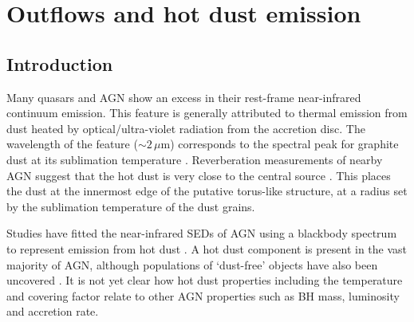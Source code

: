 
\chapter{Outflows and hot dust emission}
\label{ch:sed} 



\section{Introduction}

Many quasars and AGN show an excess in their rest-frame near-infrared continuum emission. 
This feature is generally attributed to thermal emission from dust heated by optical/ultra-violet radiation from the accretion disc. 
The wavelength of the feature ($\sim2$\,$\mu$m) corresponds to the spectral peak for graphite dust at its sublimation temperature \citep[$T\sim1500$\,K;][]{barvainis87}. 
Reverberation measurements of nearby AGN suggest that the hot dust is very close to the central source \citep[few tens of light days; e.g.][]{minezaki04,suganuma06}.
This places the dust at the innermost edge of the putative torus-like structure, at a radius set by the sublimation temperature of the dust grains.  

Studies have fitted the near-infrared SEDs of AGN using a blackbody spectrum to represent emission from hot dust \citep[e.g.][]{edelson86,barvainis87,kishimoto07,mor09,riffel09,deo11,landt11,mor11,roseboom13}. 
A hot dust component is present in the vast majority of AGN, although populations of `dust-free' objects have also been uncovered \citep{hao10,hao11,jiang10,mor11}. 
It is not yet clear how hot dust properties including the temperature and covering factor relate to other AGN properties such as BH mass, luminosity and accretion rate. 

